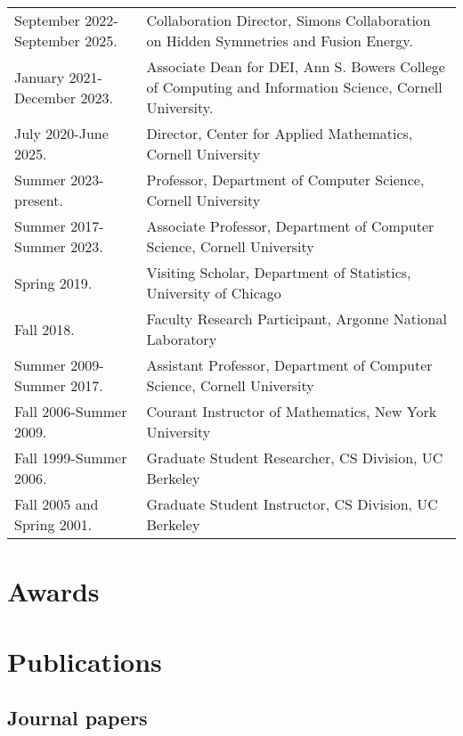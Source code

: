 \documentclass{article}
\begin{document}
\begin{tabular}{ll}
  September 2022-September 2025.
    & Collaboration Director, Simons Collaboration on Hidden Symmetries and Fusion Energy. \\
  January 2021-December 2023.
    & Associate Dean for DEI, Ann S. Bowers College of Computing and Information Science, Cornell University. \\
  July 2020-June 2025.
    & Director, Center for Applied Mathematics, Cornell University \\
  Summer 2023-present.
    & Professor, Department of Computer Science, Cornell University \\
  Summer 2017-Summer 2023.
    & Associate Professor, Department of Computer Science, Cornell University \\
  Spring 2019.
    & Visiting Scholar, Department of Statistics, University of Chicago \\
  Fall 2018.
    & Faculty Research Participant, Argonne National Laboratory \\
  Summer 2009-Summer 2017.
    & Assistant Professor, Department of Computer Science,
      Cornell University \\
  Fall 2006-Summer 2009.
    & Courant Instructor of Mathematics, New York University \\
  Fall 1999-Summer 2006.
    & Graduate Student Researcher, CS Division, UC Berkeley \\
  Fall 2005 and Spring 2001.
    & Graduate Student Instructor, CS Division, UC Berkeley
\end{tabular}


\section*{Awards}




\section*{Publications}

\subsection*{Journal papers}
\end{document}
